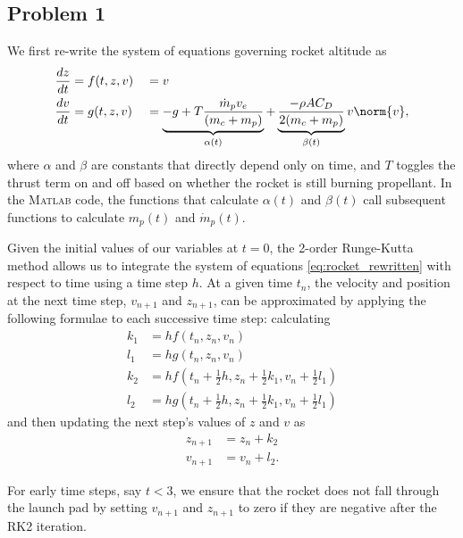 \documentclass[12pt]{article}
\begin{document}
\subsection{Problem 1}

We first re-write the system of equations governing rocket altitude as
\begin{equation}
\begin{aligned}
\frac{dz}{dt} &= f(t,z,v) &&= v
\\
\frac{dv}{dt} &= g(t,z,v) &&= \underbrace{-g + T \frac{\dot{m}_p v_e}{(m_c + m_p)}}_{\alpha(t)} + \underbrace{\frac{- \rho A C_D}{2 (m_c + m_p)}}_{\beta(t)} v \norm{v}
,
\end{aligned}
\label{eq:rocket_rewritten}
\end{equation}
where $\alpha$ and $\beta$ are constants that directly depend only on time, and $T$ toggles the thrust term on and off based on whether the rocket is still burning propellant. In the \textsc{Matlab} code, the functions that calculate $\alpha(t)$ and $\beta(t)$ call subsequent functions to calculate $m_p(t)$ and $\dot{m}_p(t)$.

Given the initial values of our variables at $t=0$, the 2\nd-order Runge-Kutta method allows us to integrate the system of equations \eqref{eq:rocket_rewritten} with respect to time using a time step $h$. At a given time $t_n$, the velocity and position at the next time step, $v_{n+1}$ and $z_{n+1}$, can be approximated by applying the following formulae to each successive time step: calculating
\begin{equation}
\begin{aligned}
k_1 &= h f(t_n, z_n, v_n)
\\
l_1 &= h g(t_n, z_n, v_n)
\\
k_2 &= h f(t_n + \tfrac{1}{2} h, z_n + \tfrac{1}{2} k_1, v_n + \tfrac{1}{2} l_1)
\\
l_2 &= h g(t_n + \tfrac{1}{2} h, z_n + \tfrac{1}{2} k_1, v_n + \tfrac{1}{2} l_1)
\end{aligned}
\end{equation}
and then updating the next step's values of $z$ and $v$ as
\begin{equation}
\begin{aligned}
z_{n+1} &= z_n + k_2
\\
v_{n+1} &= v_n + l_2
.
\end{aligned}
\end{equation}

For early time steps, say $t < 3$, we ensure that the rocket does not fall through the launch pad by setting $v_{n+1}$ and $z_{n+1}$ to zero if they are negative after the RK2 iteration.
\end{document}

